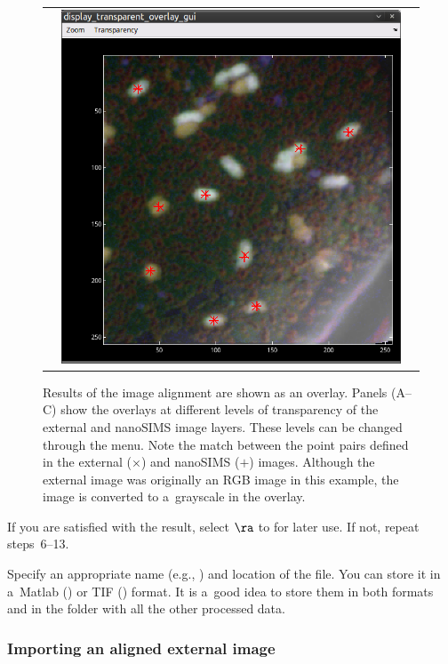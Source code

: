 \begin{figure}[!ht]
\begin{tabular}{ccc}
&
\includegraphics[scale=0.23]{figs7/LANS-ext-result3}
\end{tabular}
\caption{\label{fig:LANS-ext-result}%
Results of the image alignment are shown as an overlay. Panels (A--C) show the overlays at different levels of transparency of the external and nanoSIMS image layers. These levels can be changed through the  menu. Note the match between the point pairs defined in the external ($\times$) and nanoSIMS ($+$) images. Although the external image was originally an RGB image in this example, the image is converted to a~grayscale in the overlay.}
\end{figure}

\s If you are satisfied with the result, select  $\ra$  to  for later use. If not, repeat steps~6--13.

\nb\bul Specify an appropriate name (e.g., ) and location of the file. You can store it in a~Matlab () or TIF () format. It is a~good idea to store them in both formats and in the folder with all the other processed data.


\subsubsection{Importing an aligned external image}
\setcounter{step}{0}


